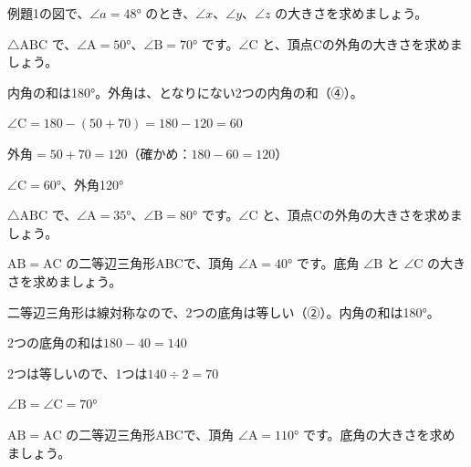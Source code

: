 \begin{jibun}
例題1の図で、$\angle a=48°$ のとき、$\angle x$、$\angle y$、$\angle z$ の大きさを求めましょう。
\end{jibun}

\begin{reidai}[三角形の内角と外角]
$\triangle\mathrm{ABC}$ で、$\angle\mathrm{A}=50°$、$\angle\mathrm{B}=70°$ です。$\angle\mathrm{C}$ と、頂点Cの外角の大きさを求めましょう。\par
\kangaekata 内角の和は180°。外角は、となりにない2つの内角の和（④）。\par
\shiki $\angle\mathrm{C}=180-(50+70)=180-120=60$\par
\hspace*{2.6\zw}外角$=50+70=120$\quad（確かめ：$180-60=120$）\par
\kotae $\angle\mathrm{C}=60°$、外角120°
\end{reidai}

\begin{jibun}
$\triangle\mathrm{ABC}$ で、$\angle\mathrm{A}=35°$、$\angle\mathrm{B}=80°$ です。$\angle\mathrm{C}$ と、頂点Cの外角の大きさを求めましょう。
\end{jibun}

\begin{reidai}[二等辺三角形の角]
$\mathrm{AB}=\mathrm{AC}$ の二等辺三角形ABCで、頂角 $\angle\mathrm{A}=40°$ です。底角 $\angle\mathrm{B}$ と $\angle\mathrm{C}$ の大きさを求めましょう。\par
\kangaekata 二等辺三角形は線対称なので、2つの底角は等しい（②）。内角の和は180°。\par
\shiki 2つの底角の和は\quad $180-40=140$\par
\hspace*{2.6\zw}2つは等しいので、1つは\quad $140\div2=70$\par
\kotae $\angle\mathrm{B}=\angle\mathrm{C}=70°$
\end{reidai}

\begin{jibun}
$\mathrm{AB}=\mathrm{AC}$ の二等辺三角形ABCで、頂角 $\angle\mathrm{A}=110°$ です。底角の大きさを求めましょう。
\end{jibun}

